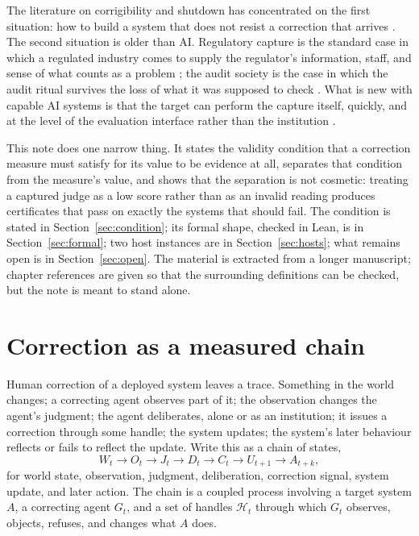 \documentclass[11pt]{article}
\theoremstyle{remark}
\begin{document}
The literature on corrigibility and shutdown has concentrated on the first situation: how to build a system that does not resist a correction that arrives \parencite{soares2015corrigibility,hadfieldmenell2017offswitch,orseau2016interruptible,thornley2023shutdown,christiano2018corrigibility}. The second situation is older than AI. Regulatory capture is the standard case in which a regulated industry comes to supply the regulator's information, staff, and sense of what counts as a problem \parencite{stigler1971theory,carpenter2010reputation}; the audit society is the case in which the audit ritual survives the loss of what it was supposed to check \parencite{power1997audit}. What is new with capable AI systems is that the target can perform the capture itself, quickly, and at the level of the evaluation interface rather than the institution \parencite{susser2019manipulation,kulveit2025gradualdisempowerment}.

This note does one narrow thing. It states the validity condition that a correction measure must satisfy for its value to be evidence at all, separates that condition from the measure's value, and shows that the separation is not cosmetic: treating a captured judge as a low score rather than as an invalid reading produces certificates that pass on exactly the systems that should fail. The condition is stated in Section~\ref{sec:condition}; its formal shape, checked in Lean, is in Section~\ref{sec:formal}; two host instances are in Section~\ref{sec:hosts}; what remains open is in Section~\ref{sec:open}. The material is extracted from a longer manuscript; chapter references are given so that the surrounding definitions can be checked, but the note is meant to stand alone.

\section{Correction as a measured chain}
\label{sec:chain}

Human correction of a deployed system leaves a trace. Something in the world changes; a correcting agent observes part of it; the observation changes the agent's judgment; the agent deliberates, alone or as an institution; it issues a correction through some handle; the system updates; the system's later behaviour reflects or fails to reflect the update. Write this as a chain of states,
\begin{equation}
W_t \rightarrow O_t \rightarrow J_t \rightarrow D_t \rightarrow C_t \rightarrow U_{t+1} \rightarrow A_{t+k},
\label{eq:chain}
\end{equation}
for world state, observation, judgment, deliberation, correction signal, system update, and later action. The chain is a coupled process involving a target system $A$, a correcting agent $G_t$, and a set of handles $\mathcal H_t$ through which $G_t$ observes, objects, refuses, and changes what $A$ does.
\end{document}

